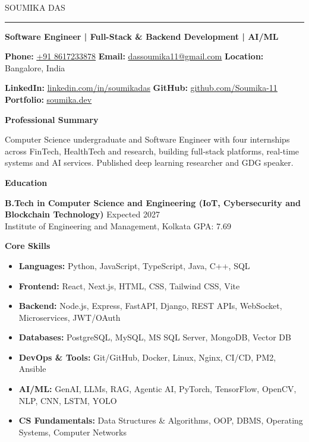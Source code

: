 \documentclass[10pt,a4paper]{article}
\newcommand{\heading}[1]{{\carlito #1}}
\newcommand{\cvsection}[1]{%
  \par\vspace{7pt}%
  {\heading{\color{sectioncolor}\large\bfseries #1}}\par\vspace{1pt}}
\newcommand{\contactlink}[2]{\href{#1}{\color{sectioncolor}\underline{#2}}}
\begin{document}
{\heading{\color{namecolor}\fontsize{22}{26}\selectfont SOUMIKA DAS}}\par
\vspace{1pt}
{\color{rulecolor}\rule{\textwidth}{0.8pt}}\par
\vspace{4pt}

{\bfseries Software Engineer | Full-Stack \& Backend Development | AI/ML}\par
\vspace{3pt}

\textbf{Phone:} \contactlink{tel:+918617233878}{+91 8617233878} \quad
\textbf{Email:} \contactlink{mailto:dassoumika11@gmail.com}{dassoumika11@gmail.com} \quad
\textbf{Location:} Bangalore, India\par
\textbf{LinkedIn:} \contactlink{https://www.linkedin.com/in/soumikadas/}{linkedin.com/in/soumikadas} \quad
\textbf{GitHub:} \contactlink{https://github.com/Soumika-11}{github.com/Soumika-11} \quad
\textbf{Portfolio:} \contactlink{https://www.soumika.dev/}{soumika.dev}\par

\cvsection{Professional Summary}
Computer Science undergraduate and Software Engineer with four internships across FinTech,
HealthTech and research, building full-stack platforms, real-time systems and AI services.
Published deep learning researcher and GDG speaker.

\cvsection{Education}
\textbf{B.Tech in Computer Science and Engineering (IoT, Cybersecurity and Blockchain
Technology)} \hfill Expected 2027\\
Institute of Engineering and Management, Kolkata \hfill GPA: 7.69

\cvsection{Core Skills}
\begin{itemize}
  \item \textbf{Languages:} Python, JavaScript, TypeScript, Java, C++, SQL
  \item \textbf{Frontend:} React, Next.js, HTML, CSS, Tailwind CSS, Vite
  \item \textbf{Backend:} Node.js, Express, FastAPI, Django, REST APIs, WebSocket, Microservices, JWT/OAuth
  \item \textbf{Databases:} PostgreSQL, MySQL, MS SQL Server, MongoDB, Vector DB
  \item \textbf{DevOps \& Tools:} Git/GitHub, Docker, Linux, Nginx, CI/CD, PM2, Ansible
  \item \textbf{AI/ML:} GenAI, LLMs, RAG, Agentic AI, PyTorch, TensorFlow, OpenCV, NLP, CNN, LSTM, YOLO
  \item \textbf{CS Fundamentals:} Data Structures \& Algorithms, OOP, DBMS, Operating Systems, Computer Networks
\end{itemize}
\end{document}
